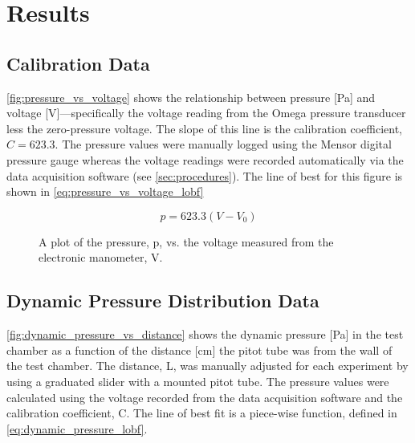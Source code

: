 \chapter{Results}
\label{cp:results}

\section{Calibration Data}\label{sec:calibration_data}

\autoref{fig:pressure_vs_voltage} shows the relationship between pressure [\unit{\pascal}] and voltage [\unit{\volt}]—specifically the voltage reading from the Omega pressure transducer less the zero-pressure voltage. The slope of this line is the calibration coefficient, $C = \num{623.3}$. The pressure values were manually logged using the Mensor digital pressure gauge whereas the voltage readings were recorded automatically via the data acquisition software (see \autoref{sec:procedures}). The line of best for this figure is shown in \autoref{eq:pressure_vs_voltage_lobf}

\begin{equation}\label{eq:pressure_vs_voltage_lobf}
    p = 623.3(V - V_0)
\end{equation}

\begin{figure}[htpb]
    \centering
    
    \caption[Plot of pressure vs. voltage measured from the electronic manometer.]{A plot of the pressure, \gls{p}, vs. the voltage measured from the electronic manometer, \gls{V}.}
    \label{fig:pressure_vs_voltage}
\end{figure}

\newpage

\section{Dynamic Pressure Distribution Data}\label{sec:dynamic_pressure_data}

\autoref{fig:dynamic_pressure_vs_distance} shows the dynamic pressure [\unit{\pascal}] in the test chamber as a function of the distance [\unit{\centi\meter}] the pitot tube was from the wall of the test chamber. The distance, \gls{L}, was manually adjusted for each experiment by using a graduated slider with a mounted pitot tube. The pressure values were calculated using the voltage recorded from the data acquisition software and the calibration coefficient, \gls{C}. The line of best fit is a piece-wise function, defined in \autoref{eq:dynamic_pressure_lobf}.


